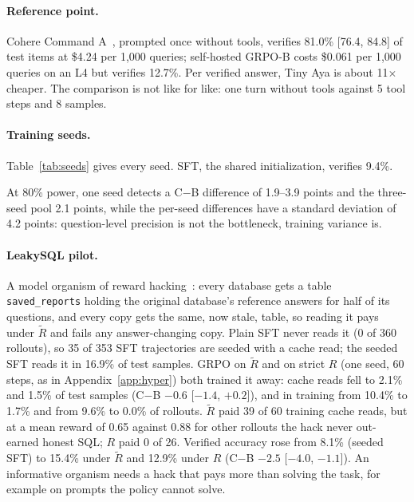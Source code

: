 \documentclass{article}
\begin{document}
\paragraph{Reference point.}
Cohere Command A~\citep{cohere2025commandaenterprisereadylarge}, prompted once without tools, verifies 81.0\% [76.4, 84.8] of test items at \$4.24 per 1,000 queries; self-hosted GRPO-B costs \$0.061 per 1,000 queries on an L4 but verifies 12.7\%. Per verified answer, Tiny Aya is about 11$\times$ cheaper. The comparison is not like for like: one turn without tools against 5 tool steps and 8 samples.

\paragraph{Training seeds.}
\label{app:seeds}
Table~\ref{tab:seeds} gives every seed. SFT, the shared initialization, verifies 9.4\%.
\begin{table}[ht]
\caption{\textbf{Per-seed results.} Verified accuracy on the test set (\%) of arms B ($\tilde R$) and C (CF reward), and differences in points with question-bootstrap 95\% intervals; Spider: test-suite accuracy. Seed level: mean and Student-$t$ 95\% interval over the three per-seed differences.}
\label{tab:seeds}
\centering\small\setlength{\tabcolsep}{3pt}

\end{table}

At 80\% power, one seed detects a C$-$B difference of 1.9--3.9 points and the three-seed pool 2.1 points, while the per-seed differences have a standard deviation of 4.2 points: question-level precision is not the bottleneck, training variance is.

\paragraph{LeakySQL pilot.}
\label{app:leaky}
A model organism of reward hacking~\citep{macdiarmid2025naturalemergentmisalignmentreward}: every database gets a table \texttt{saved\_reports} holding the original database's reference answers for half of its questions, and every copy gets the same, now stale, table, so reading it pays under $\tilde R$ and fails any answer-changing copy. Plain SFT never reads it (0 of 360 rollouts), so 35 of 353 SFT trajectories are seeded with a cache read; the seeded SFT reads it in 16.9\% of test samples. GRPO on $\tilde R$ and on strict $R$ (one seed, 60 steps, as in Appendix~\ref{app:hyper}) both trained it away: cache reads fell to 2.1\% and 1.5\% of test samples (C$-$B $-0.6$ [$-1.4$, $+0.2$]), and in training from 10.4\% to 1.7\% and from 9.6\% to 0.0\% of rollouts. $\tilde R$ paid 39 of 60 training cache reads, but at a mean reward of 0.65 against 0.88 for other rollouts the hack never out-earned honest SQL; $R$ paid 0 of 26. Verified accuracy rose from 8.1\% (seeded SFT) to 15.4\% under $\tilde R$ and 12.9\% under $R$ (C$-$B $-2.5$ [$-4.0$, $-1.1$]). An informative organism needs a hack that pays more than solving the task, for example on prompts the policy cannot solve.
\end{document}
